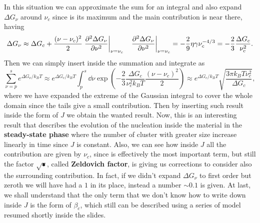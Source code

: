 {\begin{equation}
    \end{equation}
    In this situation we can approximate the sum for an integral and also expand $\Delta G_\nu$ around $\nu_c$ since is its maximum and the main contribution is near there, having
    \begin{align}
        &\Delta G_\nu \approx \Delta G_c + \frac{(\nu - \nu_c)^2}{2}\eval{\pdv[2]{\Delta G_\nu}{\nu}}_{\nu = \nu_c} &\eval{\pdv[2]{\Delta G_\nu}{\nu}}_{\nu = \nu_c} = -\frac{2}{9}\eta\gamma\nu_c^{-4/3} = -\frac{2}{3}\frac{\Delta G_c}{\nu_c^2}.
    \end{align}
    Then we can simply insert inside the summation and integrate as
    \begin{equation}
        \sum_{\nu=p}^s e^{\Delta G_\nu/k_BT} \approx e^{\Delta G_{c}/k_BT} \int_p^s \dd \nu \exp\left( -\frac{2}{3}\frac{\Delta G_c}{\nu_c^2k_BT}\frac{(\nu - \nu_c)^2}{2} \right) \approx e^{\Delta G_{c}/k_BT}\sqrt{\frac{3\pi k_BT\nu_c^2}{\Delta G_c}},
    \end{equation}
    where we have expanded the extreme of the Gaussian integral to cover the whole domain since the tails give a small contribution. Then by inserting such result inside the form of $J$ we obtain the wanted result.
}
\noindent
Now, this is an interesting result that describes the evolution of the nucleation inside the material in the \textbf{steady-state phase} where the number of cluster with greater size increase linearly in time since $J$ is constant. Also, we can see how inside $J$ all the contribution are given by $\nu_c$, since is effectively the most important term, but still the factor $\sqrt{\bullet}$, called \textbf{Zeldovich factor}, is giving us corrections to consider also the surrounding contribution. In fact, if we didn't expand $\Delta G_\nu$ to first order but zeroth we will have had a $1$ in its place, instead a number $\sim 0.1$ is given. At last, we shall understand that the only term that we don't know how to write down inside $J$ is the form of $\beta_c$, which still can be described using a series of model resumed shortly inside the slides.

